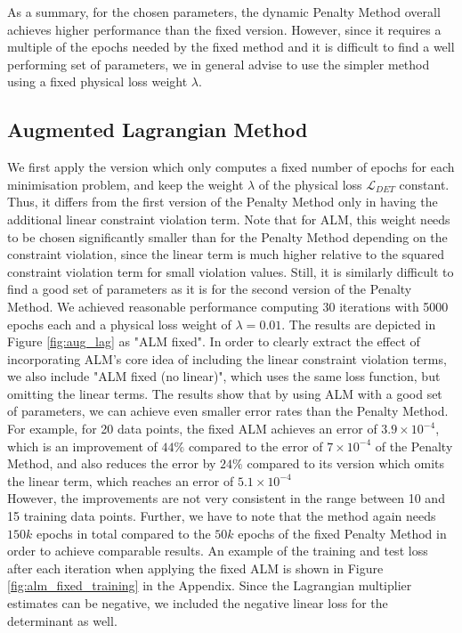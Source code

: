 As a summary, for the chosen parameters, the dynamic Penalty Method overall achieves higher performance than the fixed version. However, since it requires a multiple of the epochs needed by the fixed method and it is difficult to find a well performing set of parameters, we in general advise to use the simpler method using a fixed physical loss weight $\lambda$.

\subsection{Augmented Lagrangian Method}

We first apply the version which only computes a fixed number of epochs for each minimisation problem, and keep the weight $\lambda$ of the physical loss $\mathcal{L}_{DET}$ constant. Thus, it differs from the first version of the Penalty Method only in having the additional linear constraint violation term. Note that for ALM, this weight needs to be chosen significantly smaller than for the Penalty Method depending on the constraint violation, since the linear term is much higher relative to the squared constraint violation term for small violation values. Still, it is similarly difficult to find a good set of parameters as it is for the second version of the Penalty Method. We achieved reasonable performance computing 30 iterations with 5000 epochs each and a physical loss weight of $\lambda = 0.01$. The results are depicted in Figure \ref{fig:aug_lag} as "ALM fixed". In order to clearly extract the effect of incorporating ALM's core idea of including the linear constraint violation terms, we also include "ALM fixed (no linear)", which uses the same loss function, but omitting the linear terms. The results show that by using ALM with a good set of parameters, we can achieve even smaller error rates than the Penalty Method. For example, for 20 data points, the fixed ALM achieves an error of $3.9 \times 10^{-4}$, which is an improvement of $44\%$ compared to the error of $7 \times 10^{-4}$ of the Penalty Method, and also reduces the error by $24\%$ compared to its version which omits the linear term, which reaches an error of $5.1 \times 10^{-4} $\\
\indent However, the improvements are not very consistent in the range between 10 and 15 training data points. Further, we have to note that the method again needs $150k$ epochs in total compared to the $50k$ epochs of the fixed Penalty Method in order to achieve comparable results. An example of the training and test loss after each iteration when applying the fixed ALM is shown in Figure \ref{fig:alm_fixed_training} in the Appendix. Since the Lagrangian multiplier estimates can be negative, we included the negative linear loss for the determinant as well.

